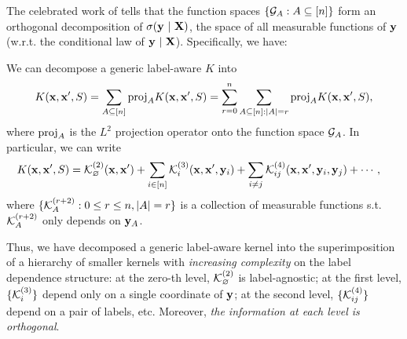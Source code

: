 The celebrated work of \cite{hoeffding1948class} tells that the function spaces $\{{\mathcal{G}}_A : A \subseteq [n]\}$ form an orthogonal decomposition of  $\sigma({\mathbf{y}} \ | \ {\mathbf{X}})$, the space of all measurable functions of ${\mathbf{y}}$ (w.r.t. the conditional law of ${\mathbf{y}} \ | \ {\mathbf{X}}$). Specifically, we have:
\begin{lemma}
\label{lemma: hoeffding_decomp}
We can decompose a generic label-aware $K$ into
\begin{equation}
	\label{eq: hoeffding_decomp}
	K({\mathbf{x}}, {\mathbf{x}}', S)  = \sum_{A \subseteq[n]}  \textnormal{proj}_AK({\mathbf{x}}, {\mathbf{x}}', S) = \sum_{r = 0}^n \sum_{A \subseteq[n]: |A| = r}  \textnormal{proj}_AK({\mathbf{x}}, {\mathbf{x}}', S),
\end{equation}
where $\textnormal{proj}_A$ is the $L^2$ projection operator onto the function space ${\mathcal{G}}_A$. In particular, we can write 
\begin{align}
\label{eq: hoefdding_decomp_layerwise} 
	K({\mathbf{x}}, {\mathbf{x}}', S) & =  
	{\mathcal{K}}^{(2)}_\varnothing({\mathbf{x}}, {\mathbf{x}}') + \sum_{i\in[n]}{\mathcal{K}}^{(3)}_i({\mathbf{x}}, {\mathbf{x}}', {\mathbf{y}}_i) + \sum_{i\neq j}{\mathcal{K}}^{(4)}_{ij}({\mathbf{x}}, {\mathbf{x}}', {\mathbf{y}}_i, {\mathbf{y}}_j) + \cdots ,
\end{align}
where $\{{\mathcal{K}}^{(r+2)}_{A}: 0\leq r\leq n , |A| = r\}$ is a collection of measurable functions s.t. ${\mathcal{K}}^{(r+2)}_A$ only depends on ${\mathbf{y}}_A$.
\end{lemma}
Thus, we have decomposed a generic label-aware kernel into the superimposition of a hierarchy of smaller kernels with \emph{increasing complexity} on the label dependence structure: at the zero-th level, ${\mathcal{K}}^{(2)}_\varnothing$ is label-agnostic; at the first level, $\{{\mathcal{K}}^{(3)}_i\}$ depend only on a single coordinate of ${\mathbf{y}}$; at the second level, $\{{\mathcal{K}}^{(4)}_{ij}\}$ depend on a pair of labels, etc. Moreover, \emph{the information at each level is orthogonal}. 

